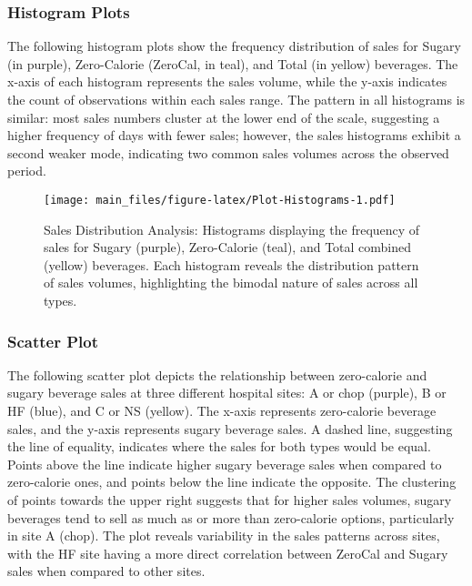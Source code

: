 \documentclass[
]{article}
\begin{document}
\hypertarget{histogram-plots}{%
\subsubsection{Histogram Plots}\label{histogram-plots}}

The following histogram plots show the frequency distribution of sales
for Sugary (in purple), Zero-Calorie (ZeroCal, in teal), and Total (in
yellow) beverages. The x-axis of each histogram represents the sales
volume, while the y-axis indicates the count of observations within each
sales range. The pattern in all histograms is similar: most sales
numbers cluster at the lower end of the scale, suggesting a higher
frequency of days with fewer sales; however, the sales histograms
exhibit a second weaker mode, indicating two common sales volumes across
the observed period.

\begin{figure}
\centering
\texttt{[image: main\_files/figure-latex/Plot-Histograms-1.pdf]}
\caption{Sales Distribution Analysis: Histograms displaying the
frequency of sales for Sugary (purple), Zero-Calorie (teal), and Total
combined (yellow) beverages. Each histogram reveals the distribution
pattern of sales volumes, highlighting the bimodal nature of sales
across all types.}
\end{figure}

\hypertarget{scatter-plot}{%
\subsubsection{Scatter Plot}\label{scatter-plot}}

The following scatter plot depicts the relationship between zero-calorie
and sugary beverage sales at three different hospital sites: A or chop
(purple), B or HF (blue), and C or NS (yellow). The x-axis represents
zero-calorie beverage sales, and the y-axis represents sugary beverage
sales. A dashed line, suggesting the line of equality, indicates where
the sales for both types would be equal. Points above the line indicate
higher sugary beverage sales when compared to zero-calorie ones, and
points below the line indicate the opposite. The clustering of points
towards the upper right suggests that for higher sales volumes, sugary
beverages tend to sell as much as or more than zero-calorie options,
particularly in site A (chop). The plot reveals variability in the sales
patterns across sites, with the HF site having a more direct correlation
between ZeroCal and Sugary sales when compared to other sites.
\end{document}
